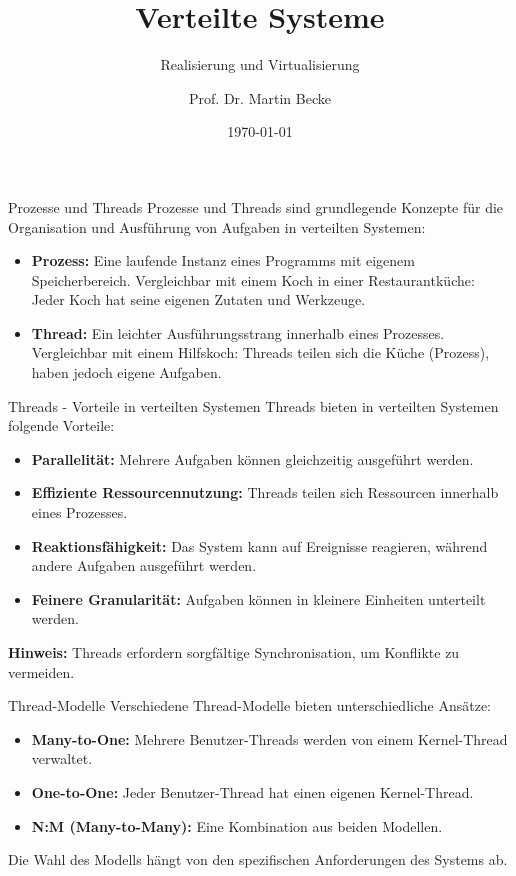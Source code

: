 \documentclass{beamer}
\title{Verteilte Systeme}
\subtitle{Realisierung und Virtualisierung}
\author{Prof. Dr. Martin Becke}
\date{\today}
\begin{document}
\begin{frame}
    \titlepage
\end{frame}

\begin{frame}{Prozesse und Threads}
    Prozesse und Threads sind grundlegende Konzepte für die Organisation und Ausführung von Aufgaben in verteilten Systemen:
    \begin{itemize}
        \item \textbf{Prozess:} Eine laufende Instanz eines Programms mit eigenem Speicherbereich. Vergleichbar mit einem Koch in einer Restaurantküche: Jeder Koch hat seine eigenen Zutaten und Werkzeuge.
        \item \textbf{Thread:} Ein leichter Ausführungsstrang innerhalb eines Prozesses. Vergleichbar mit einem Hilfskoch: Threads teilen sich die Küche (Prozess), haben jedoch eigene Aufgaben.
    \end{itemize}
\end{frame}

\begin{frame}{Threads - Vorteile in verteilten Systemen}
    Threads bieten in verteilten Systemen folgende Vorteile:
    \begin{itemize}
        \item \textbf{Parallelität:} Mehrere Aufgaben können gleichzeitig ausgeführt werden.
        \item \textbf{Effiziente Ressourcennutzung:} Threads teilen sich Ressourcen innerhalb eines Prozesses.
        \item \textbf{Reaktionsfähigkeit:} Das System kann auf Ereignisse reagieren, während andere Aufgaben ausgeführt werden.
        \item \textbf{Feinere Granularität:} Aufgaben können in kleinere Einheiten unterteilt werden.
    \end{itemize}
    \textbf{Hinweis:} Threads erfordern sorgfältige Synchronisation, um Konflikte zu vermeiden.
\end{frame}

\begin{frame}{Thread-Modelle}
    Verschiedene Thread-Modelle bieten unterschiedliche Ansätze:
    \begin{itemize}
        \item \textbf{Many-to-One:} Mehrere Benutzer-Threads werden von einem Kernel-Thread verwaltet.
        \item \textbf{One-to-One:} Jeder Benutzer-Thread hat einen eigenen Kernel-Thread.
        \item \textbf{N:M (Many-to-Many):} Eine Kombination aus beiden Modellen.
    \end{itemize}
    Die Wahl des Modells hängt von den spezifischen Anforderungen des Systems ab.
\end{frame}
\end{document}
